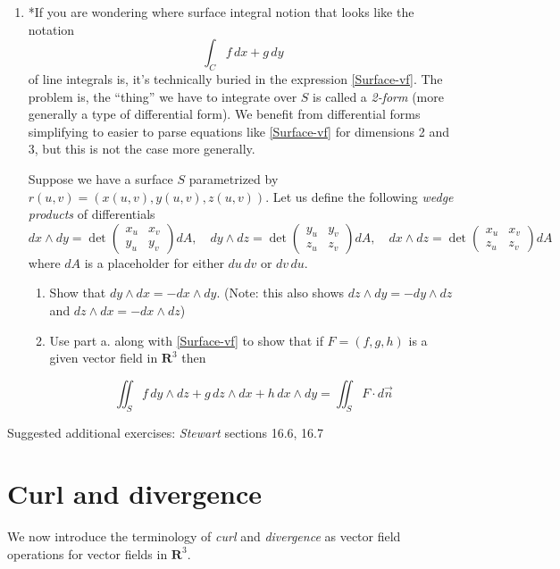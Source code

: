 \documentclass[12pt]{article}
\numberwithin{equation}{subsection}
\numberwithin{figure}{subsection}
\theoremstyle{note}
\begin{document}
{\begin{enumerate}[label=\arabic*.]
\item *If you are wondering where surface integral notion that looks like the notation \[\int_C f\,dx+g\,dy\] of line integrals is, it's technically buried in the expression \eqref{Surface-vf}. The problem is, the ``thing'' we have to integrate over $S$ is called a \textit{2-form} (more generally a type of differential form). We benefit from differential forms simplifying to easier to parse equations like \eqref{Surface-vf} for dimensions 2 and 3, but this is not the case more generally. 

Suppose we have a surface $S$ parametrized by $r(u,v)=(x(u,v), y(u,v), z(u,v))$. Let us define the following \textit{wedge products} of differentials
\[ 
	dx\wedge dy= \det \begin{pmatrix} x_u  & x_v \\ y_u & y_v \end{pmatrix}dA ,\quad  
	dy\wedge dz= \det \begin{pmatrix} y_u  & y_v \\ z_u & z_v \end{pmatrix}dA, \quad 
	dx\wedge dz= \det \begin{pmatrix} x_u  & x_v \\ z_u & z_v \end{pmatrix}dA
	\]
where $dA$ is a placeholder for either $du\,dv$ or $dv\,du$.
\begin{enumerate}
	\item Show that $dy\wedge dx=-dx\wedge dy$. (Note: this also shows $dz\wedge dy=-dy\wedge dz$ and $dz\wedge dx=-dx\wedge dz$)
		
	\item Use part a. along with \eqref{Surface-vf} to show that if $F=(f,g,h)$ is a given vector field in $\mathbf{R}^3$ then 
	
	\[ \iint_{S} f \, dy\wedge dz + g\, dz\wedge dx+h \, dx\wedge dy =\iint_{S} F\cdot d\vec{n} \] 
\end{enumerate}
\end{enumerate}

Suggested additional exercises: \textit{Stewart} sections 16.6, 16.7


\section{Curl and divergence}

We now introduce the terminology of \textit{curl} and \textit{divergence} as vector field operations for vector fields in $\mathbf{R}^3$. 


}
\end{document}
